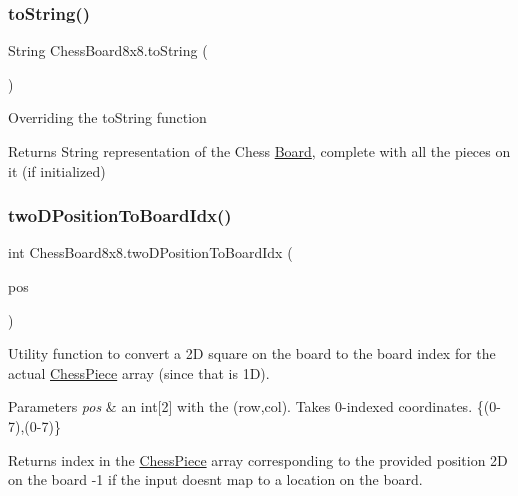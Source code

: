 \subsubsection{\texorpdfstring{to\+String()}{toString()}}
{\footnotesize\ttfamily String Chess\+Board8x8.\+to\+String (\begin{DoxyParamCaption}{ }\end{DoxyParamCaption})}

Overriding the to\+String function \begin{DoxyReturn}{Returns}
String representation of the Chess \mbox{\hyperlink{class_board}{Board}}, complete with all the pieces on it (if initialized) 
\end{DoxyReturn}
\mbox{\label{class_chess_board8x8_a10f0c0aa276bc842b54c1011120d581d}} 
\subsubsection{\texorpdfstring{two\+D\+Position\+To\+Board\+Idx()}{twoDPositionToBoardIdx()}\hspace{0.1cm}{\footnotesize\ttfamily [1/2]}}
{\footnotesize\ttfamily int Chess\+Board8x8.\+two\+D\+Position\+To\+Board\+Idx (\begin{DoxyParamCaption}\item[{@Not\+Null int \mbox{[}$\,$\mbox{]}}]{pos }\end{DoxyParamCaption})\hspace{0.3cm}{\ttfamily [protected]}}

Utility function to convert a 2D square on the board to the board index for the actual \mbox{\hyperlink{class_chess_piece}{Chess\+Piece}} array (since that is 1D). 
\begin{DoxyParams}{Parameters}
{\em pos} & an int\mbox{[}2\mbox{]} with the (row,col). Takes 0-\/indexed coordinates. \{(0-\/7),(0-\/7)\} \\
\hline
\end{DoxyParams}
\begin{DoxyReturn}{Returns}
index in the \mbox{\hyperlink{class_chess_piece}{Chess\+Piece}} array corresponding to the provided position 2D on the board -\/1 if the input doesn\textquotesingle{}t map to a location on the board. 
\end{DoxyReturn}
\mbox{\label{class_chess_board8x8_af12fb8a2eb5b727375727717d448534f}} 
